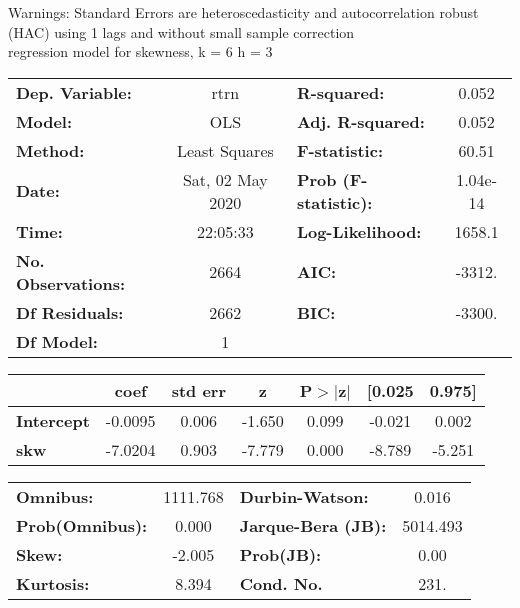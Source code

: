 Warnings: \newline
 [1] Standard Errors are heteroscedasticity and autocorrelation robust (HAC) using 1 lags and without small sample correction\\ 

regression model for skewness, k = 6 h = 3\begin{center}
\begin{tabular}{lclc}
\toprule
\textbf{Dep. Variable:}    &       rtrn       & \textbf{  R-squared:         } &     0.052   \\
\textbf{Model:}            &       OLS        & \textbf{  Adj. R-squared:    } &     0.052   \\
\textbf{Method:}           &  Least Squares   & \textbf{  F-statistic:       } &     60.51   \\
\textbf{Date:}             & Sat, 02 May 2020 & \textbf{  Prob (F-statistic):} &  1.04e-14   \\
\textbf{Time:}             &     22:05:33     & \textbf{  Log-Likelihood:    } &    1658.1   \\
\textbf{No. Observations:} &        2664      & \textbf{  AIC:               } &    -3312.   \\
\textbf{Df Residuals:}     &        2662      & \textbf{  BIC:               } &    -3300.   \\
\textbf{Df Model:}         &           1      & \textbf{                     } &             \\
\bottomrule
\end{tabular}
\begin{tabular}{lcccccc}
                   & \textbf{coef} & \textbf{std err} & \textbf{z} & \textbf{P$> |$z$|$} & \textbf{[0.025} & \textbf{0.975]}  \\
\midrule
\textbf{Intercept} &      -0.0095  &        0.006     &    -1.650  &         0.099        &       -0.021    &        0.002     \\
\textbf{skw}       &      -7.0204  &        0.903     &    -7.779  &         0.000        &       -8.789    &       -5.251     \\
\bottomrule
\end{tabular}
\begin{tabular}{lclc}
\textbf{Omnibus:}       & 1111.768 & \textbf{  Durbin-Watson:     } &    0.016  \\
\textbf{Prob(Omnibus):} &   0.000  & \textbf{  Jarque-Bera (JB):  } & 5014.493  \\
\textbf{Skew:}          &  -2.005  & \textbf{  Prob(JB):          } &     0.00  \\
\textbf{Kurtosis:}      &   8.394  & \textbf{  Cond. No.          } &     231.  \\
\bottomrule
\end{tabular}
\end{center}

